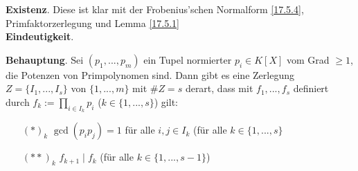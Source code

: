 \documentclass[../../main.tex]{subfiles}
\begin{document}
\begin{cproof}
\textbf{Existenz}. Diese ist klar mit der Frobenius'schen Normalform \ref{17.5.4}, Primfaktorzerlegung und Lemma \ref{17.5.1}\\

\noindent\textbf{Eindeutigkeit}.
\begin{tcolorbox}[arc=0mm, boxrule=0.2mm]\noindent\textbf{Behauptung}. Sei $(p_1,...,p_m)$ ein Tupel normierter $p_i\in K[X]$ vom Grad $\ge 1$, die Potenzen von Primpolynomen sind. Dann gibt es eine Zerlegung $Z=\{I_1,...,I_s\}$ von $\{1,...,m\}$ mit $\#Z=s$ derart, dass mit $f_1,...,f_s$ definiert durch $f_k:=\prod_{i\in I_k}p_i$ ($k\in\{1,...,s\}$) gilt:
\begin{itemize}
\item[$(*)_k$] $\gcd(p_ip_j)=1$ für alle $i,j\in I_k$ (für alle $k\in\{1,...,s\}$
\item[$(**)_k$] $f_{k+1}\mid f_k$ (für alle $k\in\{1,...,s-1\}$)
\end{itemize}


\end{tcolorbox}
\end{cproof}
\end{document}

